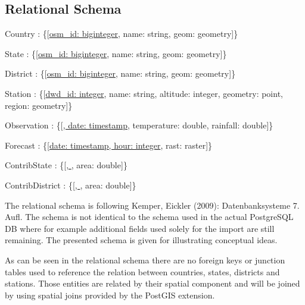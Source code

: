 \documentclass[paper=a4, fontsize=11pt]{scrartcl} %
\numberwithin{equation}{section} %
\numberwithin{figure}{section} %
\numberwithin{table}{section} %
\begin{document}

\subsection{Relational Schema}
  
  Country : \{{[}\uline{osm\_id: biginteger}, name: string, geom:  geometry{]}\}

  State : \{{[}\uline{osm\_id: biginteger}, name: string, geom: geometry{]}\}

  District : \{{[}\uline{osm\_id: biginteger}, name: string, geom: geometry{]}\}

  Station : \{{[}\uline{dwd\_id: integer}, name: string, altitude: integer, geometry: point, region: geometry{]}\}

  Observation : \{{[}\uline{, date: timestamp}, temperature: double, rainfall: double{]}\}

  Forecast : \{{[}\uline{date: timestamp, hour: integer}, rast: raster{]}\}

  ContribState : \{{[}\uline{, }, area: double{]}\}

  ContribDistrict : \{{[}\uline{, }, area: double{]}\}


  The relational schema is following Kemper, Eickler (2009): Datenbanksysteme 7. Aufl. 
  The schema is not identical to the schema used in the actual PostgreSQL DB where for example 
  additional fields used solely for the import are still remaining. The presented
  schema is given for illustrating conceptual ideas. 


  As can be seen in the relational schema there are no foreign keys or junction tables
  used to reference the relation between countries, states, districts and stations. 
  Those entities are related by their spatial component and will be joined by using
  spatial joins provided by the PostGIS extension. 
\end{document}
